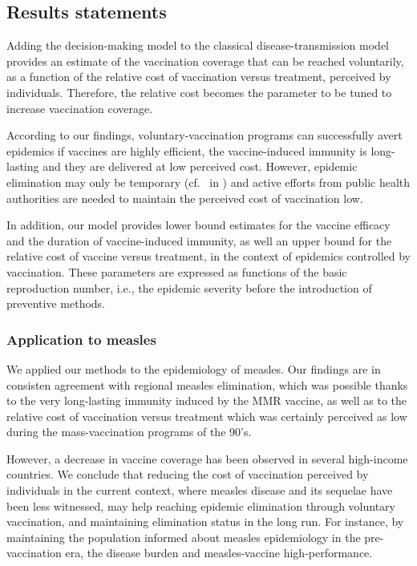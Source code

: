 \subsection{Results statements}
\label{Vaccine:Results}

Adding the decision-making model to the classical disease-transmission model provides an estimate of the vaccination coverage that can be reached voluntarily, as a function of the relative cost of vaccination versus treatment, perceived by individuals. Therefore, the relative cost becomes the parameter to be tuned to increase vaccination coverage.

According to our findings, voluntary-vaccination programs can successfully avert epidemics if vaccines are highly efficient, the vaccine-induced immunity is long-lasting and they are delivered at low perceived cost. However, epidemic elimination may only be temporary (cf.~ in ) and active efforts from public health authorities are needed to maintain the perceived cost of vaccination low. 

In addition, our model provides lower bound estimates for the vaccine efficacy and the duration of vaccine-induced immunity, as well an upper bound for the relative cost of vaccine versus treatment, in the context of epidemics controlled by vaccination. These parameters are expressed as functions of the basic reproduction number, i.e., the epidemic severity before the introduction of preventive methods. 




\subsubsection{Application to measles}
We applied our methods to the epidemiology of measles. Our findings are in consisten agreement with regional measles elimination, which was possible thanks to the very long-lasting immunity induced by the MMR vaccine, as well as to the relative cost of vaccination versus treatment which was certainly perceived as low during the mass-vaccination programs of the 90's. 

However, a decrease in vaccine coverage has been observed in several high-income countries. We conclude that reducing the cost of vaccination perceived by individuals in the current context, where measles disease and its sequelae have been less witnessed, may help reaching epidemic elimination through voluntary vaccination, and maintaining elimination status in the long run. For instance, by maintaining the population informed about measles epidemiology in the pre-vaccination era, the disease burden and measles-vaccine high-performance.

